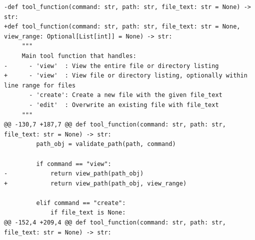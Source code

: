 \documentclass{article}
\begin{document}
\begin{lstlisting}[style=diffstyle]
-def tool_function(command: str, path: str, file_text: str = None) -> str:
+def tool_function(command: str, path: str, file_text: str = None, view_range: Optional[List[int]] = None) -> str:
     """
     Main tool function that handles:
-      - 'view'  : View the entire file or directory listing
+      - 'view'  : View file or directory listing, optionally within line range for files
       - 'create': Create a new file with the given file_text
       - 'edit'  : Overwrite an existing file with file_text
     """
@@ -130,7 +187,7 @@ def tool_function(command: str, path: str, file_text: str = None) -> str:
         path_obj = validate_path(path, command)
 
         if command == "view":
-            return view_path(path_obj)
+            return view_path(path_obj, view_range)
 
         elif command == "create":
             if file_text is None:
@@ -152,4 +209,4 @@ def tool_function(command: str, path: str, file_text: str = None) -> str:
 

\end{lstlisting}
\end{document}
